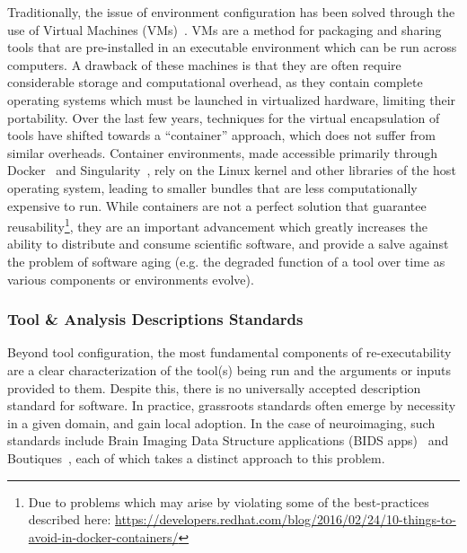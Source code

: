 Traditionally, the issue of environment configuration has been solved through the use of Virtual Machines
(VMs)~\cite{smith2005virtual}. VMs are a method for packaging and sharing tools that are pre-installed in an executable
environment which can be run across computers. A drawback of these machines is that they are often require considerable
storage and computational overhead, as they contain complete operating systems which must be launched in virtualized
hardware, limiting their portability. Over the last few years, techniques for the virtual encapsulation of tools have
shifted towards a ``container'' approach, which does not suffer from similar overheads. Container environments,
made accessible primarily through Docker~\cite{merkel2014docker} and Singularity~\cite{kurtzer2017singularity}, rely on
the Linux kernel and other libraries of the host operating system, leading to smaller bundles that are less computationally
expensive to run. While containers are not a perfect solution that guarantee reusability\footnote{Due to problems which
may arise by violating some of the best-practices described here:
\url{https://developers.redhat.com/blog/2016/02/24/10-things-to-avoid-in-docker-containers/}}, they are an important
advancement which greatly increases the ability to distribute and consume scientific software, and provide a salve
against the problem of software aging (e.g. the degraded function of a tool over time as various components or
environments evolve).

\subsubsection{Tool \& Analysis Descriptions Standards}
Beyond tool configuration, the most fundamental components of re-executability are a clear characterization of the
tool(s) being run and the arguments or inputs provided to them. Despite this, there is no universally accepted
description standard for software. In practice, grassroots standards often emerge by necessity in a given domain, and
gain local adoption. In the case of neuroimaging, such standards include Brain Imaging Data Structure applications
(BIDS apps)~\cite{gorgolewski2017bids} and Boutiques~\cite{Glatard2018-tu}, each of which takes a distinct approach to
this problem.

